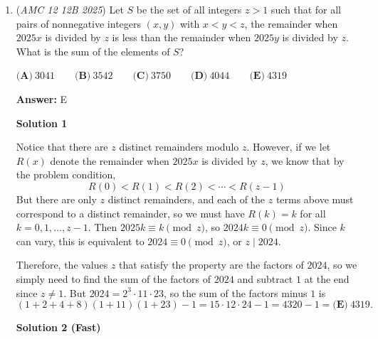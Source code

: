 \begin{enumerate}
 {Step 3: Maximize the area}Substituting our expression for $a^2 + b^2$ into the area formula gives:
 \[\text{Area} = a - \frac{3}{16}\]To maximize the area, we need to maximize $a$. Since $b^2 \ge 0$, we have $a - \frac{3}{16} \ge 0$, which implies $a \ge \frac{3}{16}$. 

 To maximize $a$, we minimize $b^2$ by setting $b = 0$. This places $z$ at the rightmost point of the circle on the real axis, where:
 \[a = \frac{1}{2} + \frac{1}{4} = \frac{3}{4}\]

 Substituting $a = \frac{3}{4}$ and $b = 0$ into our area equation:
 \[\text{Area} = \frac{3}{4} - \frac{3}{16} = \frac{9}{16}\]

 Thus, the greatest possible area is $\boxed{\frac{9}{16}}.$



	\item (\textit{AMC 12 12B 2025}) Let $S$ be the set of all integers $z > 1$ such that for all pairs of nonnegative integers $(x, y)$ with $x < y < z$, the remainder when $2025x$ is divided by $z$ is less than the remainder when $2025y$ is divided by $z$. What is the sum of the elements of $S$?


 $\textbf{(A)}~3041 \qquad \textbf{(B)}~3542 \qquad \textbf{(C)}~3750 \qquad \textbf{(D)}~4044 \qquad \textbf{(E)}~4319$

 \textbf{Answer: }E



\textbf{Solution 1}

Notice that there are $z$ distinct remainders modulo $z$. However, if we let $R(x)$ denote the remainder when $2025x$ is divided by $z$, we know that by the problem condition,
 \[R(0)<R(1)<R(2)<\cdots<R(z-1)\]But there are only $z$ distinct remainders, and each of the $z$ terms above must correspond to a distinct remainder, so we must have $R(k)=k$ for all $k=0,1,\dots,z-1$. Then $2025k\equiv k\pmod{z}$, so $2024k\equiv 0\pmod{z}$. Since $k$ can vary, this is equivalent to $2024\equiv 0\pmod{z}$, or $z\mid 2024$.

 Therefore, the values $z$ that satisfy the property are the factors of $2024$, so we simply need to find the sum of the factors of $2024$ and subtract $1$ at the end since $z\ne 1$. But $2024=2^3\cdot 11\cdot 23$, so the sum of the factors minus $1$ is
 \[(1+2+4+8)(1+11)(1+23)-1=15\cdot12\cdot24-1=4320-1=\boxed{\textbf{(E)}~4319 }.\]




\textbf{Solution 2 (Fast)}


\end{enumerate}
